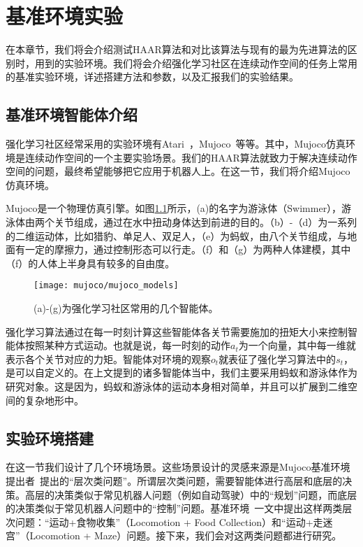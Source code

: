 \chapter{基准环境实验}
在本章节，我们将会介绍测试HAAR算法和对比该算法与现有的最为先进算法的区别时，用到的实验环境。我们将会介绍强化学习社区在连续动作空间的任务上常用的基准实验环境，详述搭建方法和参数，以及汇报我们的实验结果。

\section{基准环境智能体介绍}
强化学习社区经常采用的实验环境有Atari~\cite{atari_2013}，Mujoco~\cite{benchmarking_RL}等等。其中，Mujoco仿真环境是连续动作空间的一个主要实验场景。我们的HAAR算法就致力于解决连续动作空间的问题，最终希望能够把它应用于机器人上。在这一节，我们将介绍Mujoco仿真环境。

Mujoco是一个物理仿真引擎。如图\ref{fig:mujoco}所示，(a)的名字为游泳体（Swimmer），游泳体由两个关节组成，通过在水中扭动身体达到前进的目的。（b）-（d）为一系列的二维运动体，比如猎豹、单足人、双足人，（e）为蚂蚁，由八个关节组成，与地面有一定的摩擦力，通过控制形态可以行走。（f）和（g）为两种人体建模，其中（f）的人体上半身具有较多的自由度。

	\begin{figure}[h] %
        \centering
        \texttt{[image: mujoco/mujoco\_models]}
        \caption{(a)-(g)为强化学习社区常用的几个智能体。}
        \label{fig:mujoco}
    \end{figure}
    
强化学习算法通过在每一时刻计算这些智能体各关节需要施加的扭矩大小来控制智能体按照某种方式运动。也就是说，每一时刻的动作$a_t$为一个向量，其中每一维就表示各个关节对应的力矩。智能体对环境的观察$o_t$就表征了强化学习算法中的$s_t$，是可以自定义的。在上文提到的诸多智能体当中，我们主要采用蚂蚁和游泳体作为研究对象。这是因为，蚂蚁和游泳体的运动本身相对简单，并且可以扩展到二维空间的复杂地形中。

\section{实验环境搭建}
在这一节我们设计了几个环境场景。这些场景设计的灵感来源是Mujoco基准环境提出者~\cite{benchmarking_RL}提出的``层次类问题''。所谓层次类问题，需要智能体进行高层和底层的决策。高层的决策类似于常见机器人问题（例如自动驾驶）中的``规划''问题，而底层的决策类似于常见机器人问题中的``控制''问题。基准环境~\cite{benchmarking_RL}一文中提出这样两类层次问题：``运动+食物收集''（Locomotion + Food Collection）和``运动+走迷宫''（Locomotion + Maze）问题。接下来，我们会对这两类问题都进行研究。

